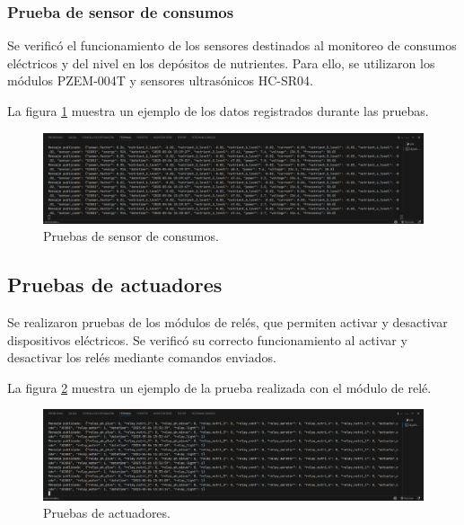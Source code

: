 \subsubsection{Prueba de sensor de consumos}

Se verificó el funcionamiento de los sensores destinados al monitoreo de
consumos eléctricos y del nivel en los depósitos de nutrientes. Para ello, se
utilizaron los módulos PZEM-004T y sensores ultrasónicos HC-SR04.

La figura \ref{fig:medicion_sensor_consumo} muestra un ejemplo de los datos
registrados durante las pruebas.

\begin{figure}[H]
    \centering
    \includegraphics[width=\textwidth]{Images/53_sensor_consumos.png}
    \caption[Pruebas de sensor de consumos]{Pruebas de sensor de consumos.}
    \label{fig:medicion_sensor_consumo}
\end{figure}

\subsection{Pruebas de actuadores}

Se realizaron pruebas de los módulos de relés, que permiten activar y
desactivar dispositivos eléctricos. Se verificó su correcto funcionamiento al
activar y desactivar los relés mediante comandos enviados.

La figura \ref{fig:prueba_rele_1} muestra un ejemplo de la prueba realizada con
el módulo de relé.

\begin{figure}[H]
    \centering
    \includegraphics[width=\textwidth]{Images/54_actuadores.png}
    \caption[Pruebas de actuadores]{Pruebas de actuadores.}
    \label{fig:prueba_rele_1}
\end{figure}

